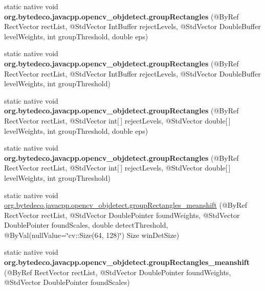 \begin{DoxyCompactItemize}
\item 
\mbox{\label{group__objdetect_ga7c0de900e01296d889903a2162fc7ce2}} 
static native void {\bfseries org.\+bytedeco.\+javacpp.\+opencv\+\_\+objdetect.\+group\+Rectangles} (@By\+Ref Rect\+Vector rect\+List, @Std\+Vector Int\+Buffer reject\+Levels, @Std\+Vector Double\+Buffer level\+Weights, int group\+Threshold, double eps)
\item 
\mbox{\label{group__objdetect_gacfcab915c2487b0e9e668a5112485992}} 
static native void {\bfseries org.\+bytedeco.\+javacpp.\+opencv\+\_\+objdetect.\+group\+Rectangles} (@By\+Ref Rect\+Vector rect\+List, @Std\+Vector Int\+Buffer reject\+Levels, @Std\+Vector Double\+Buffer level\+Weights, int group\+Threshold)
\item 
\mbox{\label{group__objdetect_ga07c36de0f77b853e9f294ea55ba827b5}} 
static native void {\bfseries org.\+bytedeco.\+javacpp.\+opencv\+\_\+objdetect.\+group\+Rectangles} (@By\+Ref Rect\+Vector rect\+List, @Std\+Vector int\mbox{[}$\,$\mbox{]} reject\+Levels, @Std\+Vector double\mbox{[}$\,$\mbox{]} level\+Weights, int group\+Threshold, double eps)
\item 
\mbox{\label{group__objdetect_gaf841e651d0e43c0f2dea6c17d01a1506}} 
static native void {\bfseries org.\+bytedeco.\+javacpp.\+opencv\+\_\+objdetect.\+group\+Rectangles} (@By\+Ref Rect\+Vector rect\+List, @Std\+Vector int\mbox{[}$\,$\mbox{]} reject\+Levels, @Std\+Vector double\mbox{[}$\,$\mbox{]} level\+Weights, int group\+Threshold)
\item 
static native void \hyperlink{group__objdetect_ga4dcd81c59aa342c781c93522088dc6be}{org.\+bytedeco.\+javacpp.\+opencv\+\_\+objdetect.\+group\+Rectangles\+\_\+meanshift} (@By\+Ref Rect\+Vector rect\+List, @Std\+Vector Double\+Pointer found\+Weights, @Std\+Vector Double\+Pointer found\+Scales, double detect\+Threshold, @By\+Val(null\+Value=\char`\"{}cv\+::\+Size(64, 128)\char`\"{}) Size win\+Det\+Size)
\item 
\mbox{\label{group__objdetect_gaf9130e86eeeb6cf679502df34849ce02}} 
static native void {\bfseries org.\+bytedeco.\+javacpp.\+opencv\+\_\+objdetect.\+group\+Rectangles\+\_\+meanshift} (@By\+Ref Rect\+Vector rect\+List, @Std\+Vector Double\+Pointer found\+Weights, @Std\+Vector Double\+Pointer found\+Scales)

\end{DoxyCompactItemize}
